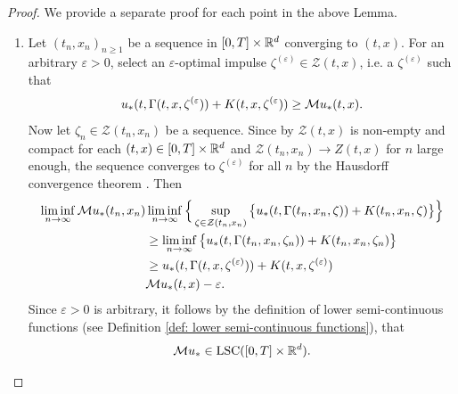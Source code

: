 \begin{proof}
    We provide a separate proof for each point in the above Lemma. 
    \begin{enumerate}[label=(\roman*)]
        \item Let $(t_n,x_n)_{n \geq 1}$ be a sequence in $[0,T] \times \mathbb{R}^d$ converging to $(t,x)$. For an arbitrary $\varepsilon > 0$, select an $\varepsilon$-optimal impulse $\zeta^{(\varepsilon)} \in \mathcal{Z}(t,x)$, i.e. a $\zeta^{(\varepsilon)}$ such that
        \begin{equation*}
            u_*(t,\Gamma(t,x, \zeta^{(\varepsilon})) + K(t,x,\zeta^{(\varepsilon})) \geq \mathcal{M} u_*(t,x). 
        \end{equation*}
        Now let $\zeta_n \in \mathcal{Z}(t_n,x_n)$ be a sequence. Since by  $\mathcal{Z}(t,x)$ is non-empty and compact for each $(t,x) \in [0,T] \times \mathbb{R}^d$ and $\mathcal{Z}(t_n,x_n) \rightarrow Z(t,x)$ for $n$ large enough, the sequence converges to $\zeta^{(\varepsilon)}$ for all $n$ by the Hausdorff convergence theorem \cite[Chapter 7]{burago2001course}. Then
        \begin{align*}
            \liminf_{n \rightarrow \infty} \mathcal{M} u_*(t_n,x_n) & \liminf_{n \rightarrow \infty} \Big\{ \sup_{\zeta \in \mathcal{Z}(t_n,x_n)}\big\{u_*(t,\Gamma(t_n,x_n,\zeta)) + K(t_n,x_n,\zeta)\big\} \Big\}\\
            & \geq \liminf_{n \rightarrow \infty} \big\{u_*(t,\Gamma(t_n,x_n,\zeta_n)) + K(t_n,x_n,\zeta_n)\big\} \\
            & \geq u_*(t,\Gamma(t,x,\zeta^{(\varepsilon)})) + K(t,x,\zeta^{(\varepsilon)}) \\
            & \mathcal{M} u_* (t,x) - \varepsilon.
        \end{align*}
        Since $\varepsilon > 0$ is arbitrary, it follows by the definition of lower semi-continuous functions (see Definition \ref{def: lower semi-continuous functions}), that 
        \begin{equation*}
            \mathcal{M} u_* \in \operatorname{LSC}([0,T] \times \mathbb{R}^d). 
        \end{equation*}
        

\end{enumerate}
\end{proof}
